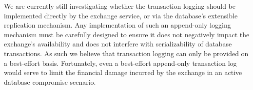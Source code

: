 \documentclass[11pt]{article}
\begin{document}
We are currently still investigating whether the transaction logging should be
implemented directly by the exchange service, or via the database's extensible
replication mechanism.  Any implementation of such an append-only logging
mechanism must be carefully designed to ensure it does not negatively impact
the exchange's availability and does not interfere with serializability of
database transactions.  As such we believe that transaction logging can only be
provided on a best-effort basis.  Fortunately, even a best-effort append-only
transaction log would serve to limit the financial damage incurred by the
exchange in an active database compromise scenario.
\end{document}
